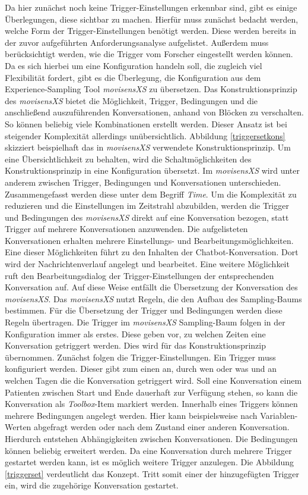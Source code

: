 Da hier zunächst noch keine Trigger-Einstellungen erkennbar sind, gibt es einige Überlegungen, diese sichtbar zu machen. Hierfür muss zunächst bedacht werden, welche Form der Trigger-Einstellungen benötigt werden. Diese werden bereits in der zuvor aufgeführten Anforderungsanalyse aufgelistet. Außerdem muss berücksichtigt werden, wie die Trigger vom Forscher eingestellt werden können. Da es sich hierbei um eine Konfiguration handeln soll, die zugleich viel Flexibilität fordert, gibt es die Überlegung, die Konfiguration aus dem Experience-Sampling Tool \emph{movisensXS} zu übersetzen. Das Konstruktionsprinzip des \emph{movisensXS} bietet die Möglichkeit, Trigger, Bedingungen und die anschließend auszuführenden Konversationen, anhand von Blöcken zu verschalten. So können beliebig viele Kombinationen erstellt werden. Dieser Ansatz ist bei steigender Komplexität allerdings unübersichtlich. Abbildung \ref{triggersetkons} skizziert beispielhaft das in \emph{movisensXS} verwendete Konstruktionsprinzip. Um eine Übersichtlichkeit zu behalten, wird die Schaltmöglichkeiten des Konstruktionsprinzip in eine Konfiguration übersetzt. Im \emph{movisensXS} wird unter anderem zwischen Trigger, Bedingungen und Konversationen unterschieden. Zusammengefasst werden diese unter dem Begriff \emph{Time}. Um die Komplexität zu reduzieren und die Einstellungen im Zeitstrahl abzubilden, werden die Trigger und Bedingungen des \emph{movisensXS} direkt auf eine Konversation bezogen, statt Trigger auf mehrere Konversationen anzuwenden. Die aufgelisteten Konversationen erhalten mehrere Einstellungs- und Bearbeitungsmöglichkeiten. Eine dieser Möglichkeiten führt zu den Inhalten der Chatbot-Konversation. Dort wird der Nachrichtenverlauf angelegt und bearbeitet. Eine weitere Möglichkeit ruft den Bearbeitungsdialog der Trigger-Einstellungen der entsprechenden Konversation auf. Auf diese Weise entfällt die Übersetzung der Konversation des \emph{movisensXS}. Das \emph{movisensXS} nutzt Regeln, die den Aufbau des Sampling-Baums bestimmen. Für die Übersetzung der Trigger und Bedingungen werden diese Regeln übertragen. Die Trigger im \emph{movisensXS} Sampling-Baum folgen in der Konfiguration immer als erstes. Diese geben vor, zu welchen Zeiten eine Konversation getriggert werden. Dies wird für das Konstruktionsprinzip übernommen. Zunächst folgen die Trigger-Einstellungen. Ein Trigger muss konfiguriert werden. Dieser gibt zum einen an, durch wen oder was und an welchen Tagen die die Konversation getriggert wird. Soll eine Konversation einem Patienten zwischen Start und Ende dauerhaft zur Verfügung stehen, so kann die Konversation als \emph{Toolbox}-Item markiert werden.  Innerhalb eines Triggers können mehrere Bedingungen angelegt werden. Hier kann beispielsweise nach Variablen-Werten abgefragt werden oder nach dem Zustand einer anderen Konversation. Hierdurch entstehen Abhängigkeiten zwischen Konversationen. Die Bedingungen können beliebig erweitert werden. Da eine Konversation durch mehrere Trigger gestartet werden kann, ist es möglich weitere Trigger anzulegen. Die Abbildung \ref{triggerset} verdeutlicht das Konzept. Tritt somit einer der hinzugefügten Trigger ein, wird die zugehörige Konversation gestartet.

